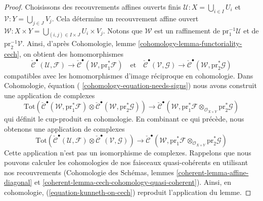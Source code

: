 \begin{proof}
\medskip\noindent
 Choisissons des recouvrements affines ouverts finis 
$\mathcal{U} : X = \bigcup_{i \in I} U_i$ et 
$\mathcal{V} : Y = \bigcup_{j \in J} V_j$.
Cela détermine un recouvrement affine ouvert 
$\mathcal{W} : X \times Y = \bigcup_{(i, j) \in I \times J} U_i \times V_j$.
Notons que $\mathcal{W}$ est un raffinement de 
$\text{pr}_1^{-1}\mathcal{U}$ et de $\text{pr}_2^{-1}\mathcal{V}$.
 Ainsi, d'après Cohomologie, lemme \ref{cohomology-lemma-functoriality-cech},
on obtient des homomorphismes 
$$
\check{\mathcal{C}}^\bullet(\mathcal{U}, \mathcal{F}) \to
\check{\mathcal{C}}^\bullet(\mathcal{W}, \text{pr}_1^*\mathcal{F})
\quad\text{et}\quad
\check{\mathcal{C}}^\bullet(\mathcal{V}, \mathcal{G}) \to
\check{\mathcal{C}}^\bullet(\mathcal{W}, \text{pr}_2^*\mathcal{G})
$$
 compatibles avec les homomorphismes d'image réciproque en cohomologie. Dans Cohomologie, équation ( 
\ref{cohomology-equation-needs-signs})
nous avons construit une application de complexes 
$$
\text{Tot}(
\check{\mathcal{C}}^\bullet(\mathcal{W}, \text{pr}_1^*\mathcal{F})
\otimes
\check{\mathcal{C}}^\bullet(\mathcal{W}, \text{pr}_2^*\mathcal{G}))
\longrightarrow
\check{\mathcal{C}}^\bullet(\mathcal{W},
\text{pr}_1^*\mathcal{F} \otimes_{\mathcal{O}_{X \times Y}}
\text{pr}_2^*\mathcal{G})
$$
 qui définit le cup-produit en cohomologie. En combinant ce qui précède, nous
obtenons une application de complexes 
\begin{equation}
\label{equation-kunneth-on-cech}
\text{Tot}(
\check{\mathcal{C}}^\bullet(\mathcal{U}, \mathcal{F})
\otimes
\check{\mathcal{C}}^\bullet(\mathcal{V}, \mathcal{G}))
\longrightarrow
\check{\mathcal{C}}^\bullet(\mathcal{W},
\text{pr}_1^*\mathcal{F} \otimes_{\mathcal{O}_{X \times Y}}
\text{pr}_2^*\mathcal{G})
\end{equation}
 Cette application n'est pas
un isomorphisme de complexes. Rappelons que nous pouvons calculer les
cohomologies de nos faisceaux quasi-cohérents en utilisant nos
recouvrements (Cohomologie des Schémas, lemmes 
\ref{coherent-lemma-affine-diagonal} et 
\ref{coherent-lemma-cech-cohomology-quasi-coherent}).
Ainsi, en cohomologie, (\ref{equation-kunneth-on-cech}) reproduit l'application
du lemme.


\end{proof}
